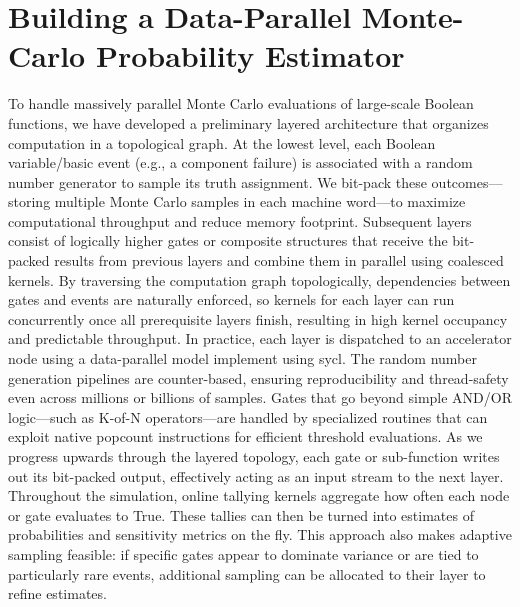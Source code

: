 \chapter{Building a Data-Parallel Monte-Carlo Probability Estimator}

To handle massively parallel Monte Carlo evaluations of large-scale Boolean functions, we have developed a preliminary layered architecture that organizes computation in a topological graph. At the lowest level, each Boolean variable/basic event (e.g., a component failure) is associated with a random number generator to sample its truth assignment. We bit-pack these outcomes—storing multiple Monte Carlo samples in each machine word—to maximize computational throughput and reduce memory footprint. Subsequent layers consist of logically higher gates or composite structures that receive the bit-packed results from previous layers and combine them in parallel using coalesced kernels. By traversing the computation graph topologically, dependencies between gates and events are naturally enforced, so kernels for each layer can run concurrently once all prerequisite layers finish, resulting in high kernel occupancy and predictable throughput.
In practice, each layer is dispatched to an accelerator node using a data-parallel model implement using \acrshort{sycl}. The random number generation pipelines are counter-based, ensuring reproducibility and thread-safety even across millions or billions of samples. Gates that go beyond simple AND/OR logic—such as K-of-N operators—are handled by specialized routines that can exploit native popcount instructions for efficient threshold evaluations. As we progress upwards through the layered topology, each gate or sub-function writes out its bit-packed output, effectively acting as an input stream to the next layer.
Throughout the simulation, online tallying kernels aggregate how often each node or gate evaluates to True. These tallies can then be turned into estimates of probabilities and sensitivity metrics on the fly. This approach also makes adaptive sampling feasible: if specific gates appear to dominate variance or are tied to particularly rare events, additional sampling can be allocated to their layer to refine estimates.







